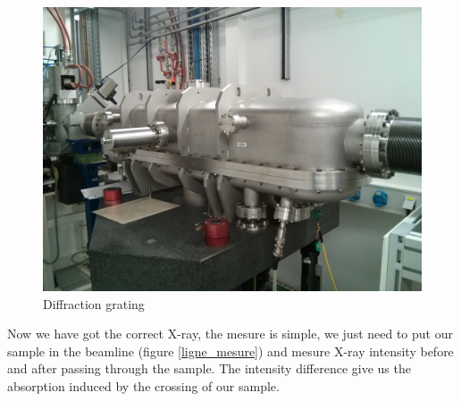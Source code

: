 \documentclass[11pt,a4paper,oneside]{article}
\begin{document}
\begin{figure}[H]
    \begin{center}
        \includegraphics[scale=0.11]{Images/IMG_20151210_202740.jpg}
        \caption{Diffraction grating}
        \label{Reseau_diffract}
    \end{center}
\end{figure}
\medskip

Now we have got the correct X-ray, the mesure is simple, we just need to put our sample in the beamline (figure \ref{ligne_mesure}) and mesure X-ray intensity before and after passing through the sample. The intensity difference give us the absorption induced by the crossing of our sample.
\end{document}
